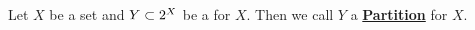 \newcommand{\Partition}[0]{\textbf{\hyperref[def:Partition]{Partition}}\xspace}
\newcommand{\Partitions}[0]{\textbf{\hyperref[def:Partition]{Partitions}}\xspace}
\begin{df}[Partition]
\label{def:Partition}
\rm
    Let $X$ be a set and 
    $Y \subset 2^{X}$ 
    be a \Disjoint \Cover for $X$. 
    Then we call $Y$ a \Partition
    for $X$. 
\end{df}

